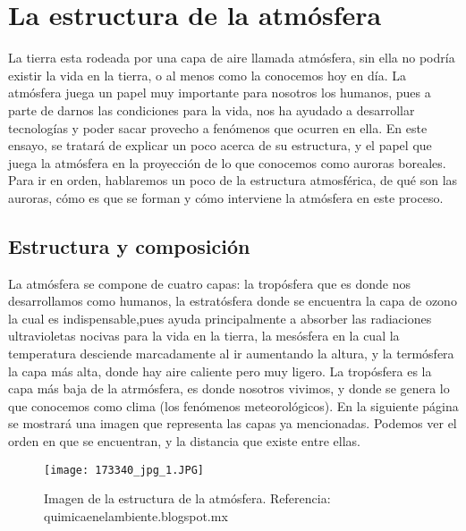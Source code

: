 \documentclass{article}
\begin{document}
\section{La estructura de la atmósfera}
\begin{doublespace}
La tierra esta rodeada por una capa de aire llamada atmósfera, sin ella no podría existir la vida en la tierra, o al menos como la conocemos hoy en día. La atmósfera juega un papel muy importante para nosotros los humanos, pues a parte de darnos las condiciones para la vida, nos ha ayudado a desarrollar tecnologías y poder sacar provecho a fenómenos que ocurren en ella. En este ensayo, se tratará de explicar un poco acerca de su estructura, y el papel que juega la atmósfera en la proyección de lo que conocemos como auroras boreales. \\
Para ir en orden, hablaremos un poco de la estructura atmosférica, de qué son las auroras, cómo es que se forman y cómo interviene la atmósfera en este proceso. 


\subsection{Estructura y composición}
La atmósfera se compone de cuatro capas: la tropósfera que es donde nos desarrollamos como humanos, la estratósfera donde se encuentra la capa de ozono la cual es indispensable,pues ayuda principalmente a absorber las radiaciones ultravioletas nocivas para la vida en la tierra, la mesósfera en la cual la temperatura desciende marcadamente al ir aumentando la altura, y la termósfera la capa más alta, donde hay aire caliente pero muy ligero. La tropósfera es la capa más baja de la atrmósfera, es donde nosotros vivimos, y donde se genera lo que conocemos como clima (los fenómenos meteorológicos). En la siguiente página se mostrará una imagen que representa las capas ya mencionadas. Podemos ver el orden en que se encuentran, y la distancia que existe entre ellas. 
\begin{figure}[!ht]
\begin{center}
\texttt{[image: 173340\_jpg\_1.JPG]}
\caption{Imagen de la estructura de la atmósfera. Referencia: quimicaenelambiente.blogspot.mx}
\end{center}
\end{figure}

\end{doublespace}
\pagebreak
\end{document}
